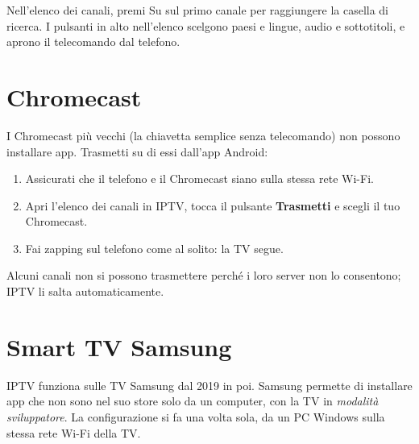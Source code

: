 Nell'elenco dei canali, premi Su sul primo canale per raggiungere la casella
di ricerca. I pulsanti in alto nell'elenco scelgono paesi e lingue, audio e
sottotitoli, e aprono il telecomando dal telefono.


\section{Chromecast}
\label{sec:chromecast}

I Chromecast più vecchi (la chiavetta semplice senza telecomando) non possono
installare app. Trasmetti su di essi dall'app Android:
\begin{enumerate}
  \item Assicurati che il telefono e il Chromecast siano sulla stessa rete
        Wi-Fi.
  \item Apri l'elenco dei canali in IPTV, tocca il pulsante
        \textbf{Trasmetti} e scegli il tuo Chromecast.
  \item Fai zapping sul telefono come al solito: la TV segue.
\end{enumerate}
Alcuni canali non si possono trasmettere perché i loro server non lo
consentono; IPTV li salta automaticamente.

\section{Smart TV Samsung}

IPTV funziona sulle TV Samsung dal 2019 in poi. Samsung permette di
installare app che non sono nel suo store solo da un computer, con la TV in
\emph{modalità sviluppatore}. La configurazione si fa una volta sola, da un PC
Windows sulla stessa rete Wi-Fi della TV.

